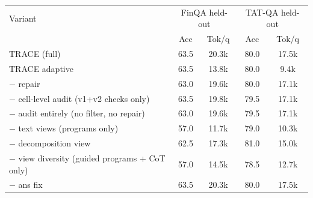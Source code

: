 \begin{tabular}{lcccc}
\toprule
Variant & \multicolumn{2}{c}{FinQA held-out} & \multicolumn{2}{c}{TAT-QA held-out} \\
 & Acc & Tok/q & Acc & Tok/q \\
\midrule
TRACE (full) & 63.5 & 20.3k & 80.0 & 17.5k \\
TRACE adaptive & 63.5 & 13.8k & 80.0 & 9.4k \\
$-$ repair & 63.0 & 19.6k & 80.0 & 17.1k \\
$-$ cell-level audit (v1+v2 checks only) & 63.5 & 19.8k & 79.5 & 17.1k \\
$-$ audit entirely (no filter, no repair) & 63.0 & 19.6k & 79.5 & 17.1k \\
$-$ text views (programs only) & 57.0 & 11.7k & 79.0 & 10.3k \\
$-$ decomposition view & 62.5 & 17.3k & 81.0 & 15.0k \\
$-$ view diversity (guided programs + CoT only) & 57.0 & 14.5k & 78.5 & 12.7k \\
$-$ ans fix & 63.5 & 20.3k & 80.0 & 17.5k \\
\bottomrule
\end{tabular}
